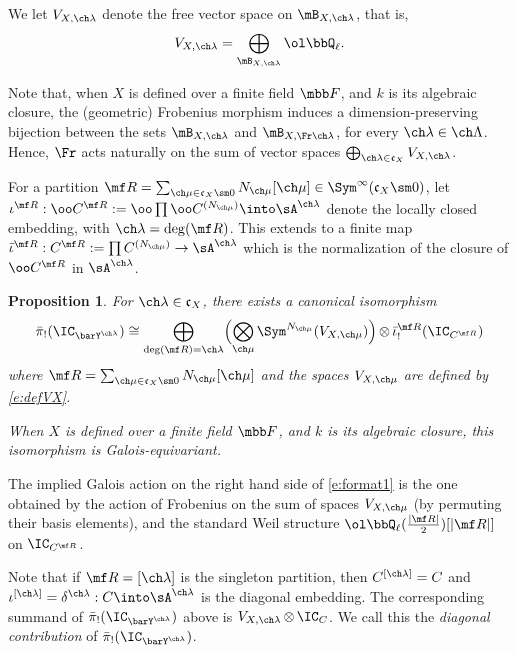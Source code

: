 \documentclass[final]{amsart}
\newtheorem{prop}[subsubsection]{Proposition}
\theoremstyle{remark}
\theoremstyle{definition}
\DeclareMathOperator*{\ot}{\otimes}
\numberwithin{equation}{section}
\begin{document}
We let $V_{X,\ch\lambda}$ denote the free vector space on $\mB_{X,\ch\lambda}$, that is, 
\begin{equation}\label{e:defVX}
V_{X,\ch\lambda} = \bigoplus_{\mB_{X,\ch\lambda}} \ol\bbQ_\ell.
\end{equation}


Note that, when $X$ is defined over a finite field $\mbb F$, and $k$ is its algebraic closure, the (geometric) Frobenius morphism induces a dimension-preserving bijection between the sets $\mB_{X,\ch\lambda}$ and $\mB_{X,\Fr\ch\lambda}$, for every $\ch\lambda\in\ch\Lambda$. Hence, $\Fr$ acts naturally on the sum of vector spaces $\bigoplus_{\ch\lambda\in\mathfrak c_X} V_{X,\ch\lambda}$. 

For a partition $\mf R = \sum_{\ch\mu \in \mathfrak c_X \sm 0} N_{\ch\mu} [\ch\mu] \in \Sym^\infty(\mathfrak c_X\sm 0)$, 
let $\iota^{\mf R} : \oo C^{\mf R} := \oo\prod \oo C^{(N_{\ch\mu})}
\into \sA^{\ch\lambda}$ denote the locally closed embedding, with $\ch\lambda = \deg(\mf R)$.
This extends to a finite map $\bar\iota^{\mf R} : C^{\mf R}:=\prod C^{(N_{\ch\mu})} \to \sA^{\ch\lambda}$ which is the normalization of the closure of $\oo C^{\mf R}$ in 
$\sA^{\ch\lambda}$.

\begin{prop} \label{prop:format}
For $\ch\lambda \in \mathfrak c_X$, there
exists a canonical isomorphism 
\begin{equation} \label{e:format1}
 \bar\pi_!(\IC_{\barY^{\ch\lambda}}) \cong 
\bigoplus_{\deg(\mf R)=\ch\lambda} 
\Bigl( \bigotimes_{\ch\mu} 
\Sym^{N_{\ch\mu}}(V_{X,\ch\mu}) \Bigr) \ot 
\bar\iota^{\mf R}_!( \IC_{C^{\mf R}} )
\end{equation}
where $\mf R = \sum_{\ch\mu \in \mathfrak c_X\sm 0} 
N_{\ch\mu} [\ch\mu]$ and the spaces $V_{X,\ch\mu}$ are defined by \eqref{e:defVX}. 

When $X$ is defined over a finite field $\mbb F$, and $k$ is its algebraic closure, this isomorphism is Galois-equivariant. 
\end{prop}

The implied Galois action on the right hand side  of \eqref{e:format1} is the one obtained by the action of Frobenius on the sum of spaces $V_{X,\ch\mu}$ (by permuting their basis elements), and the standard Weil structure $\ol\bbQ_\ell(\frac{|\mf R|}{2})[|\mf R|]$ on $\IC_{C^{\mf R}}$.

Note that if $\mf R = [\ch\lambda]$ is the singleton partition, then
$C^{[\ch\lambda]}=C$ and 
$\iota^{[\ch\lambda]}=\delta^{\ch\lambda} : C \into \sA^{\ch\lambda}$
is the diagonal embedding. 
The corresponding summand of $\bar\pi_!(\IC_{\barY^{\ch\lambda}})$
above is $V_{X,\ch\lambda} \ot \IC_C$. 
We call this the \emph{diagonal contribution} of  
$\bar\pi_!(\IC_{\barY^{\ch\lambda}})$. 
\end{document}
